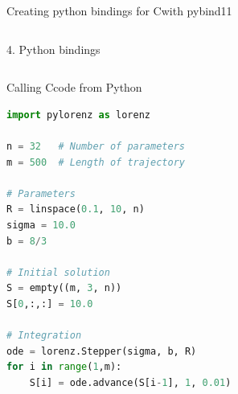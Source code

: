 \documentclass[@BEAMER_OPTIONS@]{beamer}
\newcommand{\CXX}{{\rm C}\plusplus}
\begin{document}
\begin{frame}[fragile]{Creating python bindings for \CXX with pybind11}
\begin{columns}
\begin{column}[c]{0.6\textwidth}
\begin{onlyenv}
\begin{exampleblock}{4. Python bindings}
\begin{adjustbox}{width=0.78\textwidth, height=\textheight, keepaspectratio}
\begin{minipage}{\textwidth}
                            
                        \end{minipage}
                    \end{adjustbox}
                \end{exampleblock}
            \end{onlyenv}
        \end{column}
    \end{columns}
\end{frame}

\begin{frame}[fragile]{Calling \CXX code from Python}
    \begin{exampleblock}{}
        \begin{lstlisting}[language=python]
import pylorenz as lorenz

n = 32   # Number of parameters
m = 500  # Length of trajectory

# Parameters
R = linspace(0.1, 10, n)
sigma = 10.0
b = 8/3

# Initial solution
S = empty((m, 3, n))
S[0,:,:] = 10.0

# Integration
ode = lorenz.Stepper(sigma, b, R)
for i in range(1,m):
    S[i] = ode.advance(S[i-1], 1, 0.01)
        \end{lstlisting}
    \end{exampleblock}
\end{frame}
\end{document}
